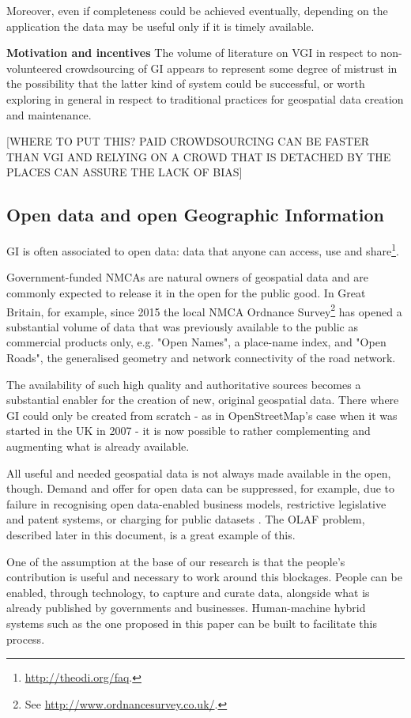 Moreover, even if completeness could be achieved eventually, depending on the application the data may be useful only if it is timely available.

\textbf{Motivation and incentives} The volume of literature on VGI in respect to non-volunteered crowdsourcing of GI appears to represent some degree of mistrust in the possibility that the latter kind of system could be successful, or worth exploring in general in respect to traditional practices for geospatial data creation and maintenance.   

[WHERE TO PUT THIS? PAID CROWDSOURCING CAN BE FASTER THAN VGI AND RELYING ON A CROWD THAT IS DETACHED BY THE PLACES CAN ASSURE THE LACK OF BIAS]

\subsection{Open data and open Geographic Information}

GI is often associated to open data: data that anyone can access, use and share\footnote{\url{http://theodi.org/faq}.}. 

Government-funded NMCAs are natural owners of geospatial data and are commonly expected to release it in the open for the public good. In Great Britain, for example, since 2015 the local NMCA Ordnance Survey\footnote{See \url{http://www.ordnancesurvey.co.uk/}.} has opened a substantial volume of data that was previously available to the public as commercial products only, e.g. "Open Names", a place-name index, and "Open Roads", the generalised geometry and network connectivity of the road network.
	
The availability of such high quality and authoritative sources becomes a substantial enabler for the creation of new, original geospatial data. There where GI could only be created from scratch - as in OpenStreetMap's case when it was started in the UK in 2007 - it is now possible to rather complementing and augmenting what is already available.

All useful and needed geospatial data is not always made available in the open, though. Demand and offer for open data can be suppressed, for example, due to failure in recognising open data-enabled business models, restrictive legislative and patent systems, or charging for public datasets \cite{shadboltpaf}. The OLAF problem, described later in this document, is a great example of this.
	
One of the assumption at the base of our research is that the people's contribution is useful and necessary to work around this blockages. People can be enabled, through technology, to capture and curate data, alongside what is already published by governments and businesses. Human-machine hybrid systems such as the one proposed in this paper can be built to facilitate this process.


